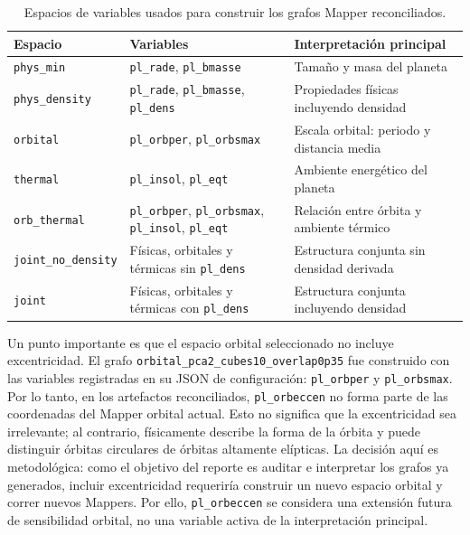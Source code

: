 \begin{table}[H]
\centering
\small
\begin{tabular}{p{}p{}p{}}
\toprule
\textbf{Espacio} & \textbf{Variables} & \textbf{Interpretación principal} \\
\midrule
\texttt{phys\_min} & \texttt{pl\_rade}, \texttt{pl\_bmasse} & Tamaño y masa del planeta \\
\texttt{phys\_density} & \texttt{pl\_rade}, \texttt{pl\_bmasse}, \texttt{pl\_dens} & Propiedades físicas incluyendo densidad \\
\texttt{orbital} & \texttt{pl\_orbper}, \texttt{pl\_orbsmax} & Escala orbital: periodo y distancia media \\
\texttt{thermal} & \texttt{pl\_insol}, \texttt{pl\_eqt} & Ambiente energético del planeta \\
\texttt{orb\_thermal} & \texttt{pl\_orbper}, \texttt{pl\_orbsmax}, \texttt{pl\_insol}, \texttt{pl\_eqt} & Relación entre órbita y ambiente térmico \\
\texttt{joint\_no\_density} & Físicas, orbitales y térmicas sin \texttt{pl\_dens} & Estructura conjunta sin densidad derivada \\
\texttt{joint} & Físicas, orbitales y térmicas con \texttt{pl\_dens} & Estructura conjunta incluyendo densidad \\
\bottomrule
\end{tabular}
\caption{Espacios de variables usados para construir los grafos Mapper reconciliados.}
\label{tab:feature_spaces_context}
\end{table}

Un punto importante es que el espacio orbital seleccionado no incluye excentricidad. El grafo \texttt{orbital\_pca2\_cubes10\_overlap0p35} fue construido con las variables registradas en su JSON de configuración: \texttt{pl\_orbper} y \texttt{pl\_orbsmax}. Por lo tanto, en los artefactos reconciliados, \texttt{pl\_orbeccen} no forma parte de las coordenadas del Mapper orbital actual. Esto no significa que la excentricidad sea irrelevante; al contrario, físicamente describe la forma de la órbita y puede distinguir órbitas circulares de órbitas altamente elípticas. La decisión aquí es metodológica: como el objetivo del reporte es auditar e interpretar los grafos ya generados, incluir excentricidad requeriría construir un nuevo espacio orbital y correr nuevos Mappers. Por ello, \texttt{pl\_orbeccen} se considera una extensión futura de sensibilidad orbital, no una variable activa de la interpretación principal.

